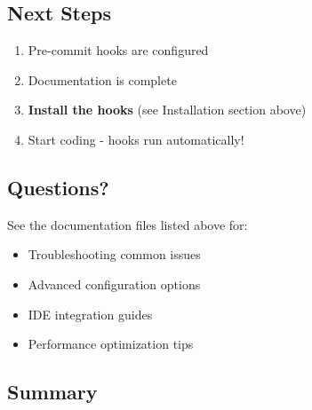 \subsection{Next Steps}\label{cr:app:archive-pre-commit-setup-summary:next-steps}

\begin{record}

\begin{enumerate}
\def\labelenumi{\arabic{enumi}.}
\tightlist
\item
  \ok{} Pre-commit hooks are configured
\item
  \ok{} Documentation is complete
\item
  \wip{} \textbf{Install the hooks} (see Installation section above)
\item
  \wip{} Start coding - hooks run automatically!
\end{enumerate}

\end{record}

\subsection{Questions?}\label{cr:app:archive-pre-commit-setup-summary:questions}

\begin{record}

See the documentation files listed above for:

\begin{itemize}
\tightlist
\item
  Troubleshooting common issues
\item
  Advanced configuration options
\item
  IDE integration guides
\item
  Performance optimization tips
\end{itemize}

\end{record}

\subsection{Summary}\label{cr:app:archive-pre-commit-setup-summary:summary}

